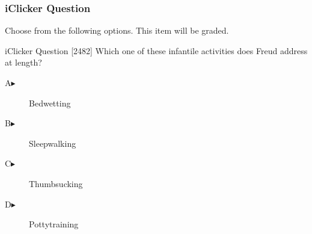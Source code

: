 \begin{frame}
  \frametitle{iClicker Question}
Choose from the following options. This item will be graded.
\begin{block}{iClicker Question}
[2482] Which one of these infantile activities does Freud address at length?
\end{block}
\begin{description}
\item[A\hspace{.2in}$\blacktriangleright$] Bedwetting
\item[B\hspace{.2in}$\blacktriangleright$] Sleepwalking
\item[C\hspace{.2in}$\blacktriangleright$] Thumbsucking
\item[D\hspace{.2in}$\blacktriangleright$] Pottytraining
\end{description}
\end{frame}